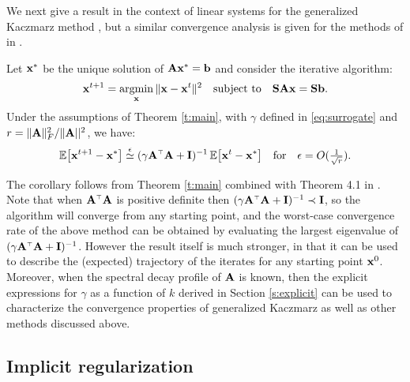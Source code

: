 \documentclass[../../thesis.tex]{subfiles}
\begin{document}
We next
give a result in the context of linear systems
for the generalized Kaczmarz method \citep{generalized-kaczmarz}, but a similar
convergence analysis is given for the methods of
\citep{Gower2019,jacsketch} in .
\begin{corollary}\label{c:kaczmarz}
  Let $\mathbf x^*$ be the unique solution of $\mathbf A\mathbf x^*=\mathbf b$ and consider
  the iterative algorithm:
  \begin{align*}
    \mathbf x^{t+1} = \operatorname*{\mathop{\mathrm{argmin}}}_\mathbf x\|\mathbf x-\mathbf x^t\|^2\quad\textnormal{subject to}\quad\mathbf{S}\mathbf A\mathbf x=\mathbf{S}\mathbf b.
  \end{align*}
  Under the assumptions of Theorem \ref{t:main}, with $\gamma$ defined in
  \eqref{eq:surrogate} and $r=\|\mathbf A\|_F^2/\|\mathbf A||^2$, we have:
  \begin{align*}
    \E\big[\x^{t+1}-\x^*\big] \overset\epsilon\simeq
    (\gamma\A^\top\A+\I)^{-1}\,\E\big[\x^t-\x^*\big]
    \quad\text{for}\quad\epsilon=O(\tfrac1{\sqrt r}).
  \end{align*}
\end{corollary}
The corollary follows from Theorem \ref{t:main} combined with Theorem
4.1 in \citep{generalized-kaczmarz}.
Note that when $\A^\top\A$ is positive definite then
$(\gamma\A^\top\A+\I)^{-1}\prec\I$, so the algorithm will
converge from any starting point, and the worst-case convergence rate of the above method can be
obtained by evaluating the largest eigenvalue of
$(\gamma\A^\top\A+\I)^{-1}$. However the result itself is much
stronger, in that it can be used to describe the (expected) trajectory of the
iterates for any starting point $\mathbf x^0$. Moreover, when the spectral decay
profile of $\mathbf A$ is known, then the explicit expressions for $\gamma$
as a function of $k$ derived in Section \ref{s:explicit} can be used
to characterize the convergence properties of generalized Kaczmarz as
well as other methods discussed above.

\subsection{Implicit regularization}\label{s:implicit}
\end{document}
